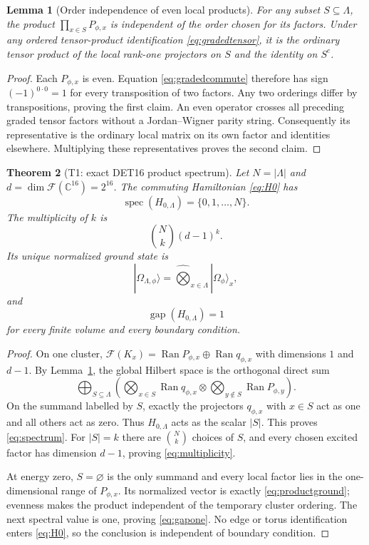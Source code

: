\documentclass[11pt]{article}
\newtheorem{theorem}{Theorem}[section]
\newtheorem{lemma}[theorem]{Lemma}
\theoremstyle{remark}
\newcommand{\F}{\mathcal F}
\newcommand{\C}{\mathbb C}
\newcommand{\gap}{\operatorname{gap}}
\begin{document}
\begin{lemma}[Order independence of even local products]
\label{lem:order}
For any subset $S\subseteq\Lambda$, the product
$\prod_{x\in S}P_{\phi,x}$ is independent of the order chosen for its
factors.  Under any ordered tensor-product identification
\eqref{eq:gradedtensor}, it is the ordinary tensor product of the local
rank-one projectors on $S$ and the identity on $S^c$.
\end{lemma}

\begin{proof}
Each $P_{\phi,x}$ is even.  Equation \eqref{eq:gradedcommute} therefore
has sign $(-1)^{0\cdot0}=1$ for every transposition of two factors.
Any two orderings differ by transpositions, proving the first claim.
An even operator crosses all preceding graded tensor factors without a
Jordan--Wigner parity string.  Consequently its representative is the
ordinary local matrix on its own factor and identities elsewhere.
Multiplying these representatives proves the second claim.
\end{proof}

\begin{theorem}[T1: exact DET16 product spectrum]
\label{thm:T1}
Let $N=|\Lambda|$ and $d=\dim\F(\C^{16})=2^{16}$.  The commuting
Hamiltonian \eqref{eq:H0} has
\[
 \operatorname{spec}(H_{0,\Lambda})=\{0,1,\ldots,N\}.
\tag{2.1}\label{eq:spectrum}
\]
The multiplicity of $k$ is
\[
 \binom Nk(d-1)^k.
\tag{2.2}\label{eq:multiplicity}
\]
Its unique normalized ground state is
\[
 |\Omega_{\Lambda,\phi}\rangle
 =\widehat{\bigotimes}_{x\in\Lambda}|\Omega_\phi\rangle_x,
\tag{2.3}\label{eq:productground}
\]
and
\[
 \gap(H_{0,\Lambda})=1
\tag{2.4}\label{eq:gapone}
\]
for every finite volume and every boundary condition.
\end{theorem}

\begin{proof}
On one cluster,
$\F(K_x)=\operatorname{Ran}P_{\phi,x}\oplus
\operatorname{Ran}q_{\phi,x}$ with dimensions $1$ and $d-1$.
By Lemma~\ref{lem:order}, the global Hilbert space is the orthogonal
direct sum
\[
 \bigoplus_{S\subseteq\Lambda}
 \left(
 \bigotimes_{x\in S}\operatorname{Ran}q_{\phi,x}
 \otimes
 \bigotimes_{y\notin S}\operatorname{Ran}P_{\phi,y}
 \right).
\tag{2.5}\label{eq:syndrome}
\]
On the summand labelled by $S$, exactly the projectors $q_{\phi,x}$
with $x\in S$ act as one and all others act as zero.  Thus
$H_{0,\Lambda}$ acts as the scalar $|S|$.  This proves
\eqref{eq:spectrum}.  For $|S|=k$ there are $\binom Nk$ choices of
$S$, and every chosen excited factor has dimension $d-1$, proving
\eqref{eq:multiplicity}.

At energy zero, $S=\varnothing$ is the only summand and every local
factor lies in the one-dimensional range of $P_{\phi,x}$.  Its
normalized vector is exactly \eqref{eq:productground}; evenness makes
the product independent of the temporary cluster ordering.  The next
spectral value is one, proving \eqref{eq:gapone}.  No edge or torus
identification enters \eqref{eq:H0}, so the conclusion is independent
of boundary condition.
\end{proof}
\end{document}

